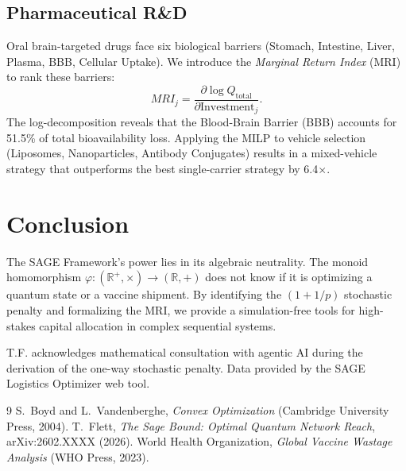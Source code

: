 \documentclass[aps,pra,reprint,amsmath,amssymb,superscriptaddress]{revtex4-2}
\begin{document}
\subsection{Pharmaceutical R\&D}
Oral brain-targeted drugs face six biological barriers (Stomach, Intestine, Liver, Plasma, BBB, Cellular Uptake). We introduce the \emph{Marginal Return Index} (MRI) to rank these barriers:
\begin{equation}
MRI_j = \frac{\partial \log Q_{\text{total}}}{\partial \text{Investment}_j} .
\end{equation}
The log-decomposition reveals that the Blood-Brain Barrier (BBB) accounts for 51.5\% of total bioavailability loss. Applying the MILP to vehicle selection (Liposomes, Nanoparticles, Antibody Conjugates) results in a mixed-vehicle strategy that outperforms the best single-carrier strategy by 6.4$\times$.


\section{Conclusion}

The SAGE Framework's power lies in its algebraic neutrality. The monoid homomorphism $\varphi: (\mathbb{R}^+, \times) \to (\mathbb{R}, +)$ does not know if it is optimizing a quantum state or a vaccine shipment. By identifying the $(1+1/p)$ stochastic penalty and formalizing the MRI, we provide a simulation-free tools for high-stakes capital allocation in complex sequential systems.

\begin{acknowledgments}
T.F. acknowledges mathematical consultation with agentic AI during the derivation of the one-way stochastic penalty. Data provided by the SAGE Logistics Optimizer web tool.
\end{acknowledgments}

\begin{thebibliography}{9}
 S.~Boyd and L.~Vandenberghe, \emph{Convex Optimization} (Cambridge University Press, 2004).
 T.~Flett, \emph{The Sage Bound: Optimal Quantum Network Reach}, arXiv:2602.XXXX (2026).
 World Health Organization, \emph{Global Vaccine Wastage Analysis} (WHO Press, 2023).
\end{thebibliography}
\end{document}
